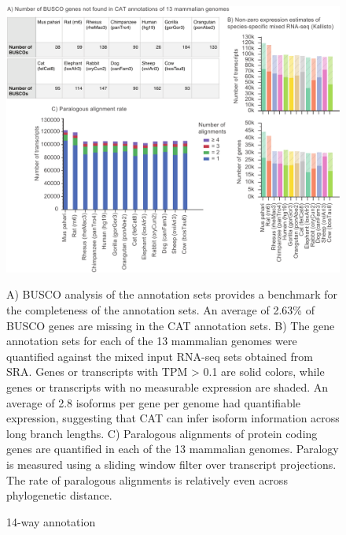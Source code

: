 \documentclass[fleqn,10pt]{wlscirep}
\begin{document}
\begin{figure}
\centering
\includegraphics[width=\textwidth,height=\textheight,keepaspectratio]{13way.pdf}
\caption{14-way annotation}
A) BUSCO analysis of the annotation sets provides a benchmark for the completeness of the annotation sets. An average of 2.63\% of BUSCO genes are missing in the CAT annotation sets. B) The gene annotation sets for each of the 13 mammalian genomes were quantified against the mixed input RNA-seq sets obtained from SRA. Genes or transcripts with TPM > 0.1 are solid colors, while genes or transcripts with no measurable expression are shaded. An average of 2.8  isoforms per gene per genome had quantifiable expression, suggesting that CAT can infer isoform information across long branch lengths. C) Paralogous alignments of protein coding genes are quantified in each of the 13 mammalian genomes. Paralogy is measured using a sliding window filter over transcript projections. The rate of paralogous alignments is relatively even across phylogenetic distance.
\label{fig:fig4}
\end{figure}
\end{document}
